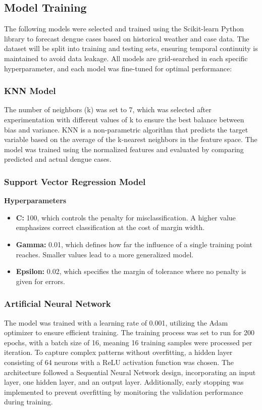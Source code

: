 \documentclass{article}
\begin{document}
\subsection{Model Training}
The following models were selected and trained using the Scikit-learn Python library to forecast dengue cases based on historical weather and case data. The dataset will be split into training and testing sets, ensuring temporal continuity is maintained to avoid data leakage. All models are grid-searched in each specific hyperparameter, and each model was fine-tuned for optimal performance:

\subsubsection{KNN Model}
The number of neighbors (k) was set to 7, which was selected after experimentation with different values of k to ensure the best balance between bias and variance. KNN is a non-parametric algorithm that predicts the target variable based on the average of the k-nearest neighbors in the feature space. The model was trained using the normalized features and evaluated by comparing predicted and actual dengue cases.

\subsubsection{Support Vector Regression Model}
\textbf{Hyperparameters}
\begin{itemize}
    \item \textbf{C:} 100, which controls the penalty for misclassification. A higher value emphasizes correct classification at the cost of margin width.
    \item \textbf{Gamma:} 0.01, which defines how far the influence of a single training point reaches. Smaller values lead to a more generalized model.
    \item \textbf{Epsilon:} 0.02, which specifies the margin of tolerance where no penalty is given for errors.
\end{itemize}

\subsubsection{Artificial Neural Network}
The model was trained with a learning rate of 0.001, utilizing the Adam optimizer to ensure efficient training. The training process was set to run for 200 epochs, with a batch size of 16, meaning 16 training samples were processed per iteration. To capture complex patterns without overfitting, a hidden layer consisting of 64 neurons with a ReLU activation function was chosen. The architecture followed a Sequential Neural Network design, incorporating an input layer, one hidden layer, and an output layer. Additionally, early stopping was implemented to prevent overfitting by monitoring the validation performance during training.
\end{document}
